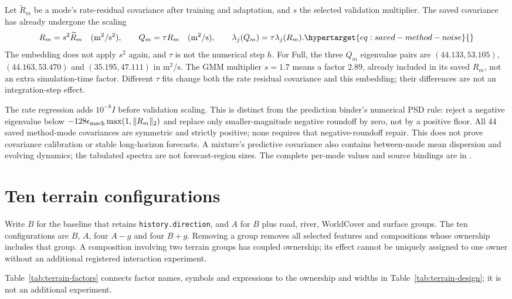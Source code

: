 Let $\widetilde R_m$ be a mode's rate-residual covariance after training and
adaptation, and $s$ the selected validation multiplier. The saved covariance
has already undergone the scaling
\begin{equation}
 R_m=s^2\widetilde R_m\quad(\mathrm{m}^2/\mathrm{s}^2),\qquad
 Q_m=\tau R_m\quad(\mathrm{m}^2/\mathrm{s}),\qquad
 \lambda_j(Q_m)=\tau\lambda_j(R_m).
 \label{eq:saved-method-noise}\hypertarget{eq:saved-method-noise}{}
\end{equation}
The embedding does not apply $s^2$ again, and $\tau$ is not the numerical
step $h$. For Full, the three $Q_m$ eigenvalue pairs are
$(44.133,53.105)$, $(44.163,53.470)$ and $(35.195,47.111)$ in
$\mathrm{m}^2/\mathrm{s}$. The GMM multiplier $s=1.7$ means a factor 2.89,
already included in its saved $R_m$, not an extra simulation-time factor.
Different $\tau$ fits change both the rate residual covariance and this
embedding; their differences are not an integration-step effect.

The rate regression adds $10^{-8}I$ before validation scaling. This is
distinct from the prediction binder's numerical PSD rule: reject a negative
eigenvalue below $-128\epsilon_{\rm mach}\max(1,\|R_m\|_2)$ and replace only
smaller-magnitude negative roundoff by zero, not by a positive floor.
All 44 saved method-mode covariances are symmetric and strictly positive;
none requires that negative-roundoff repair. This does not prove covariance
calibration or stable long-horizon forecasts. A mixture's predictive
covariance also contains between-mode mean dispersion and evolving dynamics;
the tabulated spectra are not forecast-region sizes. The complete per-mode
values and source bindings are in
.


\section{Ten terrain configurations}
Write \(B\) for the baseline that retains \texttt{history.direction}, and
\(A\) for \(B\) plus road, river, WorldCover and surface groups. The ten
configurations are \(B\), \(A\), four \(A-g\) and four \(B+g\). Removing a
group removes all selected features and compositions whose ownership includes
that group. A composition involving two terrain groups has coupled ownership;
its effect cannot be uniquely assigned to one owner without an additional
registered interaction experiment.

Table~\ref{tab:terrain-factors} connects factor names, symbols and expressions to the ownership and widths in Table~\ref{tab:terrain-design}; it is not an additional experiment.

